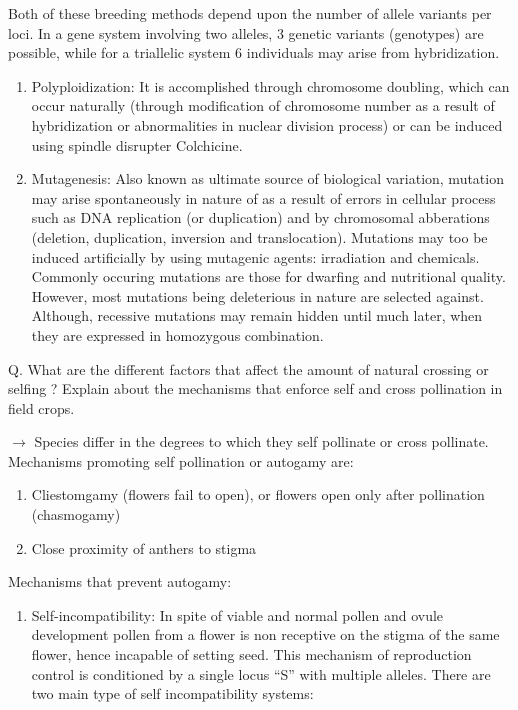 \documentclass[
  openany]{book}
\providecommand{\tightlist}{%
  \setlength{\itemsep}{0pt}\setlength{\parskip}{0pt}}
\begin{document}
Both of these breeding methods depend upon the number of allele variants per loci. In a gene system involving two alleles, 3 genetic variants (genotypes) are possible, while for a triallelic system 6 individuals may arise from hybridization.

\begin{enumerate}
\def\labelenumi{\arabic{enumi}.}
\setcounter{enumi}{2}
\item
  Polyploidization: It is accomplished through chromosome doubling, which can occur naturally (through modification of chromosome number as a result of hybridization or abnormalities in nuclear division process) or can be induced using spindle disrupter Colchicine.
\item
  Mutagenesis: Also known as ultimate source of biological variation, mutation may arise spontaneously in nature of as a result of errors in cellular process such as DNA replication (or duplication) and by chromosomal abberations (deletion, duplication, inversion and translocation). Mutations may too be induced artificially by using mutagenic agents: irradiation and chemicals. Commonly occuring mutations are those for dwarfing and nutritional quality. However, most mutations being deleterious in nature are selected against. Although, recessive mutations may remain hidden until much later, when they are expressed in homozygous combination.
\end{enumerate}

Q. What are the different factors that affect the amount of natural crossing or selfing ? Explain about the mechanisms that enforce self and cross pollination in field crops.

\(\longrightarrow\) Species differ in the degrees to which they self pollinate or cross pollinate. Mechanisms promoting self pollination or autogamy are:

\begin{enumerate}
\def\labelenumi{\arabic{enumi}.}
\tightlist
\item
  Cliestomgamy (flowers fail to open), or flowers open only after pollination (chasmogamy)
\item
  Close proximity of anthers to stigma
\end{enumerate}

Mechanisms that prevent autogamy:

\begin{enumerate}
\def\labelenumi{\arabic{enumi}.}
\tightlist
\item
  Self-incompatibility: In spite of viable and normal pollen and ovule development pollen from a flower is non receptive on the stigma of the same flower, hence incapable of setting seed. This mechanism of reproduction control is conditioned by a single locus ``S'' with multiple alleles. There are two main type of self incompatibility systems:
\end{enumerate}
\end{document}

